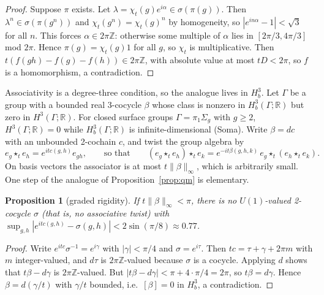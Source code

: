 \documentclass[11pt]{article}
\newtheorem{proposition}{Proposition}[section]
\theoremstyle{remark}
\begin{document}
\begin{proof}
Suppose $\pi$ exists. Let $\lambda=\chi_t(g)e^{i\alpha}\in\sigma(\pi(g))$. Then $\lambda^n\in\sigma(\pi(g^n))$ and $\chi_t(g^n)=\chi_t(g)^n$ by homogeneity, so $|e^{in\alpha}-1|<\sqrt3$ for all $n$. This forces $\alpha\in2\pi\mathbb{Z}$: otherwise some multiple of $\alpha$ lies in $[2\pi/3,4\pi/3]$ mod $2\pi$. Hence $\pi(g)=\chi_t(g)1$ for all $g$, so $\chi_t$ is multiplicative. Then $t(f(gh)-f(g)-f(h))\in2\pi\mathbb{Z}$, with absolute value at most $tD<2\pi$, so $f$ is a homomorphism, a contradiction.
\end{proof}

Associativity is a degree-three condition, so the analogue lives in $H^3_b$. Let $\Gamma$ be a group with a bounded real 3-cocycle $\beta$ whose class is nonzero in $H^3_b(\Gamma;\mathbb{R})$ but zero in $H^3(\Gamma;\mathbb{R})$. For closed surface groups $\Gamma=\pi_1\Sigma_g$ with $g\ge2$, $H^3(\Gamma;\mathbb{R})=0$ while $H^3_b(\Gamma;\mathbb{R})$ is infinite-dimensional (Soma). Write $\beta=dc$ with an unbounded 2-cochain $c$, and twist the group algebra by
\[
e_g\star_t e_h=e^{itc(g,h)}e_{gh},\qquad\text{so that}\qquad(e_g\star_te_h)\star_te_k=e^{-it\beta(g,h,k)}\,e_g\star_t(e_h\star_te_k).
\]
On basis vectors the associator is at most $t\|\beta\|_\infty$, which is arbitrarily small. One step of the analogue of Proposition~\ref{prop:qm} is elementary.

\begin{proposition}[graded rigidity]\label{prop:graded}
If $t\|\beta\|_\infty<\pi$, there is no $U(1)$-valued 2-cocycle $\sigma$ (that is, no associative twist) with $\sup_{g,h}|e^{itc(g,h)}-\sigma(g,h)|<2\sin(\pi/8)\approx0.77$.
\end{proposition}

\begin{proof}
Write $e^{itc}\sigma^{-1}=e^{i\gamma}$ with $|\gamma|<\pi/4$ and $\sigma=e^{i\tau}$. Then $tc=\tau+\gamma+2\pi m$ with $m$ integer-valued, and $d\tau$ is $2\pi\mathbb{Z}$-valued because $\sigma$ is a cocycle. Applying $d$ shows that $t\beta-d\gamma$ is $2\pi\mathbb{Z}$-valued. But $|t\beta-d\gamma|<\pi+4\cdot\pi/4=2\pi$, so $t\beta=d\gamma$. Hence $\beta=d(\gamma/t)$ with $\gamma/t$ bounded, i.e.\ $[\beta]=0$ in $H^3_b$, a contradiction.
\end{proof}
\end{document}
